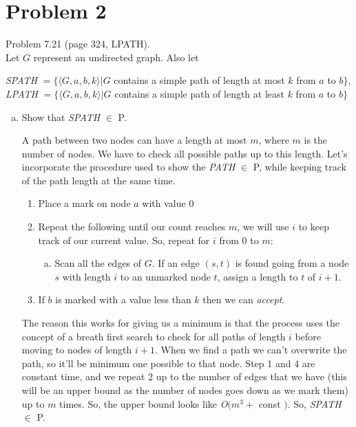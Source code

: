 \documentclass[11pt]{article}
\begin{document}
\section*{Problem 2}

Problem 7.21 (page 324, LPATH).\\


Let $G$ represent an undirected graph. Also let 
\begin{center}
    {\em SPATH} $=\{\langle G, a, b, k \rangle | G$ contains a simple path of length at most $k$ from $a$ to $b\}$,\\
    {\em LPATH} $=\{\langle G, a, b, k \rangle | G$ contains a simple path of length at least $k$ from $a$ to $b\}$\\
\end{center}
\begin{enumerate}[(a)]
    \item Show that {\em SPATH} $\in$ P.
    
    A path between two nodes can have a length at most $m$, where $m$ is the number of nodes. We have to check all possible paths up to this length. Let's incorporate the procedure used to show the {\em PATH} $\in$ P, while keeping track of the path length at the same time. 
    \begin{enumerate}[1.]
        \item Place a mark on node $a$ with value 0
        \item Repeat the following until our count reaches $m$, we will use $i$ to keep track of our current value. So, repeat for $i$ from 0 to $m$:
        \begin{enumerate}[a.]
            \item Scan all the edges of $G$. If an edge $(s,t)$ is found going from a node $s$ with length $i$ to an unmarked node $t$, assign a length to $t$ of $i+1$.
        \end{enumerate}
        \item If $b$ is marked with a value less than $k$ then we can {\em accept}.
    \end{enumerate}
    The reason this works for giving us a minimum is that the process uses the concept of a breath first search to check for all paths of length $i$ before moving to nodes of length $i+1$. When we find a path we can't overwrite the path, so it'll be minimum one possible to that node. Step 1 and 4 are constant time, and we repeat 2 up to the number of edges that we have (this will be an upper bound as the number of nodes goes down as we mark them) up to $m$ times. So, the upper bound looks like {\em O}$(m^3+$ const $)$. So, {\em SPATH} $\in$ P.
    

\end{enumerate}
\end{document}
